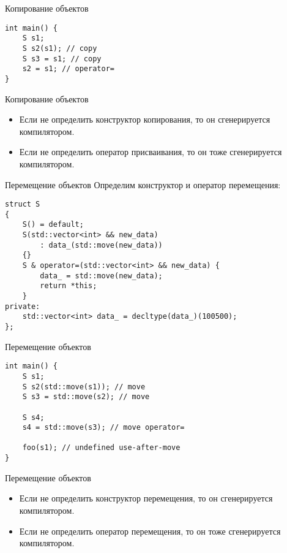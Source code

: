 \documentclass{beamer}
\begin{document}
\begin{frame}[fragile]{Копирование объектов}{}
    \begin{lstlisting}    
int main() {
    S s1;
    S s2(s1); // copy
    S s3 = s1; // copy
    s2 = s1; // operator=
}
    \end{lstlisting}
\end{frame}
    
\begin{frame}[fragile]{Копирование объектов}{}
    \begin{itemize}
        \item Если не определить конструктор копирования,
            то он сгенерируется компилятором.
        \item Если не определить оператор присваивания,
            то он тоже сгенерируется компилятором.
    \end{itemize}
\end{frame}

\begin{frame}[fragile]{Перемещение объектов}{}
    Определим конструктор и оператор перемещения:
    \begin{lstlisting}
struct S 
{
    S() = default;
    S(std::vector<int> && new_data)
        : data_(std::move(new_data))
    {}
    S & operator=(std::vector<int> && new_data) {
        data_ = std::move(new_data);
        return *this;
    }
private:
    std::vector<int> data_ = decltype(data_)(100500);
};
    \end{lstlisting}
\end{frame}

\begin{frame}[fragile]{Перемещение объектов}{}
    \begin{lstlisting}    
int main() {
    S s1;
    S s2(std::move(s1)); // move
    S s3 = std::move(s2); // move

    S s4;
    s4 = std::move(s3); // move operator=
    
    foo(s1); // undefined use-after-move
}
    \end{lstlisting}
\end{frame}
    
\begin{frame}[fragile]{Перемещение объектов}{}
    \begin{itemize}
        \item Если не определить конструктор перемещения,
            то он сгенерируется компилятором.
        \item Если не определить оператор перемещения,
            то он тоже сгенерируется компилятором.
    \end{itemize}
\end{frame}
\end{document}
